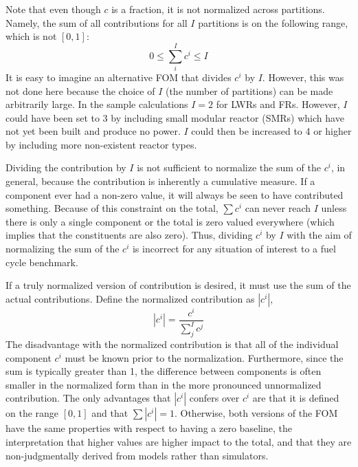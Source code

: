 Note that even though $c$ is a fraction, it is not normalized across 
partitions. Namely, the sum of all contributions for all $I$ partitions
is on the following range, which is not $[0, 1]$:
\begin{equation}
\label{sum-c-range}
0 \le \sum_i^I c^i \le I
\end{equation}
It is easy to imagine an alternative FOM that divides $c^i$ by $I$. However, 
this was not done here because the choice of $I$ (the number of partitions)
can be made arbitrarily large.  In the sample calculations $I=2$ for LWRs and
FRs.  However, $I$ could have been set to 3 by including small modular reactor
(SMRs) which have not yet been built and produce no power.  $I$ could then be 
increased to 4 or higher by including more non-existent reactor types.

Dividing the contribution by $I$ is not sufficient to 
normalize the sum of the $c^i$, in general, because the 
contribution is inherently a cumulative measure. If a component ever had a 
non-zero value, it will always be seen to have contributed something. 
Because of this constraint on the total, $\sum c^i$ can never
reach $I$ unless there is only a single component or the 
total is zero valued everywhere (which implies that the constituents are also 
zero). Thus, dividing $c^i$ by $I$ with the aim of normalizing the 
sum of the $c^i$ is incorrect for any situation of interest to a fuel 
cycle benchmark.

If a truly normalized version of contribution is desired, it must 
use the sum of the actual contributions. Define the normalized contribution 
as $|c^i|$, 
\begin{equation}
\label{norm-ci}
\left|c^i\right| = \frac{c^i}{\sum_j^I c^j}
\end{equation}
The disadvantage with the normalized contribution is that all of the 
individual component $c^i$ must be known prior to the normalization. 
Furthermore, since the sum is typically greater than 1, the difference 
between components is often smaller in the normalized form than in the
more pronounced unnormalized contribution.
The only advantages that $|c^i|$ confers over $c^i$ are that it is defined on 
the range $[0,1]$ and that $\sum |c^i| = 1$. Otherwise, both versions of the FOM
have the same properties with respect to having a zero baseline, the 
interpretation that higher values are higher impact to the total, and that they 
are non-judgmentally derived from models rather than simulators.

